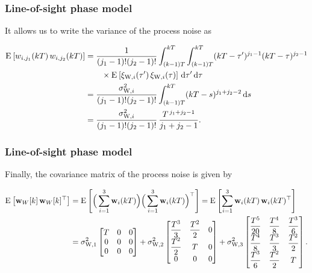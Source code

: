 \documentclass[
    hyperref={colorlinks,citecolor=DeepPink4,linkcolor=DarkRed,urlcolor=DarkBlue}
]{beamer_class}
\begin{document}
\begin{frame}
    \frametitle{Line-of-sight phase model} It allows us to write the variance of the process noise as

    \begin{align}
        \E{w_{i,j_{1}}(kT)\,w_{i,j_{2}}(kT)}
        &= \frac{1}{(j_{1}-1)!(j_{2}-1)!} \int_{(k-1)T}^{kT}\int_{(k-1)T}^{kT} (kT-\tau')^{j_{1}-1}(kT-\tau)^{j_{2}-1} \\
        &\qquad\times \E{\xi_{\mathrm{W},i}(\tau')\,\xi_{\mathrm{W},i}(\tau)} \,\mathrm{d}\tau'\,\mathrm{d}\tau \\
        &= \frac{\sigma_{\mathrm{W},i}^{2}}{(j_{1}-1)!(j_{2}-1)!} \int_{(k-1)T}^{kT} (kT-s)^{j_{1}+j_{2}-2} \,\mathrm{d}s \\
        &= \frac{\sigma_{\mathrm{W},i}^{2}}{(j_{1}-1)!(j_{2}-1)!}\,\frac{T^{\,j_{1}+j_{2}-1}}{j_{1}+j_{2}-1}.
    \end{align}

\end{frame}

\begin{frame}
    \frametitle{Line-of-sight phase model}

    Finally, the covariance matrix of the process noise is given by

    \begin{align}
        \E{\mathbf{w}_{W}[k]\,\mathbf{w}_{W}[k]^{\top}}
        &= \E{\Big(\sum_{i=1}^{3} \mathbf{w}_{i}(kT)\Big)\Big(\sum_{i=1}^{3} \mathbf{w}_{i}(kT)\Big)^{\top}} = \E{\sum_{i=1}^{3} \mathbf{w}_{i}(kT)\,\mathbf{w}_{i}(kT)^{\top}} \\
        &= \sigma_{\mathrm{W},1}^{2}\begin{bmatrix}
            T & 0 & 0 \\
            0 & 0 & 0 \\
            0 & 0 & 0
        \end{bmatrix}
        +\sigma_{\mathrm{W},2}^{2}\begin{bmatrix}
            \dfrac{T^{3}}{3} & \dfrac{T^{2}}{2} & 0 \\
            \dfrac{T^{2}}{2} & T & 0 \\
            0 & 0 & 0
        \end{bmatrix}
        +\sigma_{\mathrm{W},3}^{2}\begin{bmatrix}
            \dfrac{T^{5}}{20} & \dfrac{T^{4}}{8} & \dfrac{T^{3}}{6} \\
            \dfrac{T^{4}}{8} & \dfrac{T^{3}}{3} & \dfrac{T^{2}}{2} \\
            \dfrac{T^{3}}{6} & \dfrac{T^{2}}{2} & T
        \end{bmatrix}.
    \end{align}

\end{frame}
\end{document}
